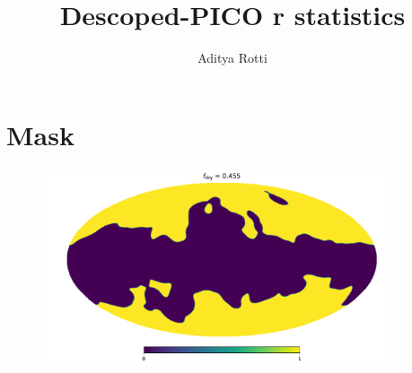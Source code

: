 \documentclass[11pt]{article}
\begin{document}
\title{Descoped-PICO r statistics}
\author{Aditya Rotti}
\date{}
\maketitle


\newpage


\newpage
\section{Mask}
\begin{figure}
\centering
\includegraphics[width=0.9\textwidth]{mask.pdf}
\end{figure}
\end{document}
